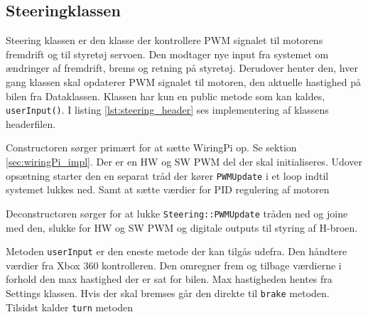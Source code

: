 \subsection{Steeringklassen} \label{sec:steering_impl}

Steering klassen er den klasse der kontrollere PWM signalet til motorens fremdrift og til styretøj servoen. 
Den modtager nye input fra systemet om ændringer af fremdrift, brems og retning på styretøj. Derudover henter den, hver gang klassen skal opdaterer PWM signalet til motoren, den aktuelle hastighed på bilen fra Dataklassen. 
Klassen har kun en public metode som kan kaldes, \texttt{userInput()}. I listing \ref{lst:steering_header} ses implementering af klassens headerfilen.



Constructoren sørger primært for at sætte WiringPi op. Se sektion \ref{sec:wiringPi_impl}. 
Der er en HW og SW PWM del der skal initialiseres. 
Udover opsætning starter den en separat tråd der kører \texttt{PWMUpdate} i et loop indtil systemet lukkes ned. 
Samt at sætte værdier for PID regulering af motoren 




Deconstructoren sørger for at lukke \texttt{Steering::PWMUpdate} tråden ned og joine med den, slukke for HW og SW PWM og digitale outputs til styring af H-broen.



Metoden \texttt{userInput} er den eneste metode der kan tilgås udefra. Den håndtere værdier fra Xbox 360 kontrolleren. Den omregner frem og tilbage værdierne i forhold den max hastighed der er sat for bilen. Max hastigheden hentes fra Settings klassen. Hvis der skal bremses går den direkte til \texttt{brake} metoden. Tilsidst kalder \texttt{turn} metoden

 

